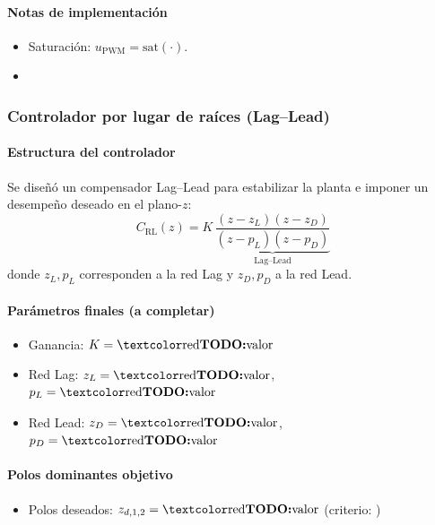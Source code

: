 \paragraph{Notas de implementación}
\begin{itemize}
	\item Saturación: \(u_{\text{PWM}}=\mathrm{sat}(\cdot)\).
	\item {}
\end{itemize}

\subsubsection{Controlador por lugar de raíces (Lag--Lead)}
\label{sec:param_rlocus}

\paragraph{Estructura del controlador}
Se diseñó un compensador Lag--Lead para estabilizar la planta e imponer un desempeño deseado en el plano-\(z\):
\[
C_{\text{RL}}(z)=K\,
\underbrace{\frac{(z-z_{L})(z-z_{D})}{(z-p_{L})(z-p_{D})}}_{\text{Lag--Lead}}
\]
donde \(z_{L},p_{L}\) corresponden a la red Lag y \(z_{D},p_{D}\) a la red Lead.

\paragraph{Parámetros finales (a completar)}
\begin{itemize}
	\item Ganancia: \(K=\TODOm{valor}\)
	\item Red Lag: \(z_{L}=\TODOm{valor}\), \(p_{L}=\TODOm{valor}\)
	\item Red Lead: \(z_{D}=\TODOm{valor}\), \(p_{D}=\TODOm{valor}\)
\end{itemize}

\paragraph{Polos dominantes objetivo}
\begin{itemize}
	\item Polos deseados: \(z_{d,1,2}=\TODOm{valor}\) (criterio: )
\end{itemize}

